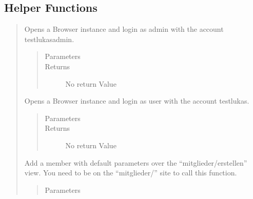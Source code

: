 \documentclass[letterpaper,10pt,english]{sphinxmanual}
\begin{document}
\subsection{Helper Functions}
\label{\detokenize{masterCodeDoc:helper-functions}}\begin{quote}


\begin{fulllineitems}
Opens a Browser instance and login as admin with the account testlukasadmin.
\begin{quote}\begin{description}
\item[{Parameters}] \leavevmode
{} \textendash{} 

\item[{Returns}] \leavevmode
No return Value

\end{description}\end{quote}

\end{fulllineitems}



\begin{fulllineitems}
Opens a Browser instance and login as user with the account testlukas.
\begin{quote}\begin{description}
\item[{Parameters}] \leavevmode
{} \textendash{} 

\item[{Returns}] \leavevmode
No return Value

\end{description}\end{quote}

\end{fulllineitems}



\begin{fulllineitems}
Add a member with default parameters over the “mitglieder/erstellen” view.
You need to be on the “mitglieder/” site to call this function.
\begin{quote}\begin{description}
\item[{Parameters}] \leavevmode
{} \textendash{} 


\end{description}
\end{quote}
\end{fulllineitems}
\end{quote}
\end{document}
